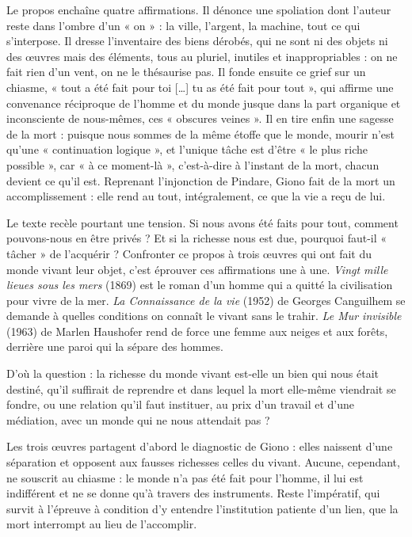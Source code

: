 \documentclass[11pt,a4paper]{article}
\begin{document}
Le propos enchaîne quatre affirmations. Il dénonce une spoliation dont l'auteur reste dans l'ombre d'un « on » : la ville, l'argent, la machine, tout ce qui s'interpose. Il dresse l'inventaire des biens dérobés, qui ne sont ni des objets ni des œuvres mais des éléments, tous au pluriel, inutiles et inappropriables : on ne fait rien d'un vent, on ne le thésaurise pas. Il fonde ensuite ce grief sur un chiasme, « tout a été fait pour toi {[}\ldots{]} tu as été fait pour tout », qui affirme une convenance réciproque de l'homme et du monde jusque dans la part organique et inconsciente de nous-mêmes, ces « obscures veines ». Il en tire enfin une sagesse de la mort : puisque nous sommes de la même étoffe que le monde, mourir n'est qu'une « continuation logique », et l'unique tâche est d'être « le plus riche possible », car « à ce moment-là », c'est-à-dire à l'instant de la mort, chacun devient ce qu'il est. Reprenant l'injonction de Pindare, Giono fait de la mort un accomplissement : elle rend au tout, intégralement, ce que la vie a reçu de lui.

Le texte recèle pourtant une tension. Si nous avons été faits pour tout, comment pouvons-nous en être privés ? Et si la richesse nous est due, pourquoi faut-il « tâcher » de l'acquérir ? Confronter ce propos à trois œuvres qui ont fait du monde vivant leur objet, c'est éprouver ces affirmations une à une. \emph{Vingt mille lieues sous les mers} (1869) est le roman d'un homme qui a quitté la civilisation pour vivre de la mer. \emph{La Connaissance de la vie} (1952) de Georges Canguilhem se demande à quelles conditions on connaît le vivant sans le trahir. \emph{Le Mur invisible} (1963) de Marlen Haushofer rend de force une femme aux neiges et aux forêts, derrière une paroi qui la sépare des hommes.

D'où la question : la richesse du monde vivant est-elle un bien qui nous était destiné, qu'il suffirait de reprendre et dans lequel la mort elle-même viendrait se fondre, ou une relation qu'il faut instituer, au prix d'un travail et d'une médiation, avec un monde qui ne nous attendait pas ?

Les trois œuvres partagent d'abord le diagnostic de Giono : elles naissent d'une séparation et opposent aux fausses richesses celles du vivant. Aucune, cependant, ne souscrit au chiasme : le monde n'a pas été fait pour l'homme, il lui est indifférent et ne se donne qu'à travers des instruments. Reste l'impératif, qui survit à l'épreuve à condition d'y entendre l'institution patiente d'un lien, que la mort interrompt au lieu de l'accomplir.
\end{document}
